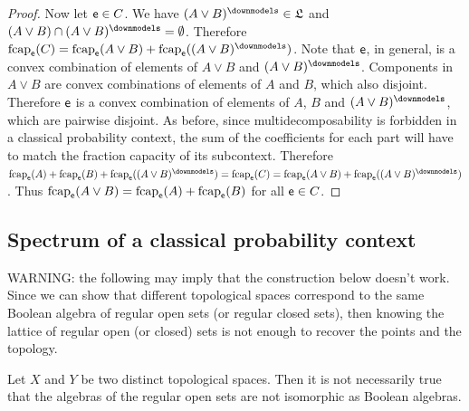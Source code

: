 \begin{mathSection}
\begin{proof}
	Now let $\mathsf{e} \in C$. We have $(A \vee B)^\separate \in \mathfrak{L}$ and $(A \vee B) \cap (A \vee B)^\separate = \emptyset$. Therefore $\fcap_{\ens}(C) = \fcap_{\ens}(A \vee B)+ \fcap_{\ens}((A \vee B)^\separate)$. Note that $\mathsf{e}$, in general, is a convex combination of elements of $A\vee B$ and $(A \vee B)^\separate$. Components in $A \vee B$ are convex combinations of elements of $A$ and $B$, which also disjoint. Therefore $\mathsf{e}$ is a convex combination of elements of $A$, $B$ and $(A \vee B)^\separate$, which are pairwise disjoint. As before, since multidecomposability is forbidden in a classical probability context, the sum of the coefficients for each part will have to match the fraction capacity of its subcontext. Therefore $\fcap_{\ens}(A) +  \fcap_{\ens}(B) + \fcap_{\ens}((A \vee B)^\separate) = \fcap_{\ens}(C) = \fcap_{\ens}(A \vee B) + \fcap_{\ens}((A \vee B)^\separate)$. Thus $\mathrm{fcap}_{\mathsf{e}}(A \vee B) = \mathrm{fcap}_{\mathsf{e}}(A) +  \mathrm{fcap}_{\mathsf{e}}(B)$ for all $\mathsf{e} \in C$.
\end{proof}
\end{mathSection}

\subsection{Spectrum of a classical probability context}

WARNING: the following may imply that the construction below doesn't work. Since we can show that different topological spaces correspond to the same Boolean algebra of regular open sets (or regular closed sets), then knowing the lattice of regular open (or closed) sets is not enough to recover the points and the topology.

\begin{prop}
	Let $X$ and $Y$ be two distinct topological spaces. Then it is not necessarily true that the algebras of the regular open sets are not isomorphic as Boolean algebras.
\end{prop}

